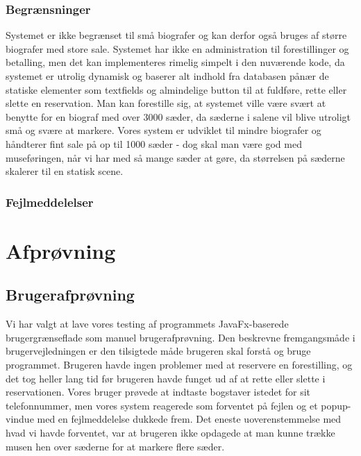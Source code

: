 \documentclass[final]{report}
\begin{document}
\subsection{Begrænsninger}
Systemet er ikke begrænset til små biografer og kan derfor også bruges af større biografer med store sale. Systemet har ikke en administration til forestillinger og betalling, men det kan implementeres rimelig simpelt i den nuværende kode, da systemet er utrolig dynamisk og baserer alt indhold fra databasen pånær de statiske elementer som textfields og almindelige button til at fuldføre, rette eller slette en reservation. Man kan forestille sig, at systemet ville være svært at benytte for en biograf med over 3000 sæder, da sæderne i salene vil blive utroligt små og svære at markere. Vores system er udviklet til mindre biografer og håndterer fint sale på op til 1000 sæder - dog skal man være god med museføringen, når vi har med så mange sæder at gøre, da størrelsen på sæderne skalerer til en statisk scene.

\subsection{Fejlmeddelelser}

\chapter{Afprøvning}

\section{Brugerafprøvning}
Vi har valgt at lave vores testing af programmets JavaFx-baserede brugergrænseflade som manuel brugerafprøvning. Den beskrevne fremgangsmåde i brugervejledningen er den tilsigtede måde brugeren skal forstå og bruge programmet.
Brugeren havde ingen problemer med at reservere en forestilling, og det tog heller lang tid før brugeren havde funget ud af at rette eller slette i reservationen. Vores bruger prøvede at indtaste bogstaver istedet for sit telefonnummer, men vores system reagerede som forventet på fejlen og et popup-vindue med en fejlmeddelelse dukkede frem. Det eneste uoverenstemmelse med hvad vi havde forventet, var at brugeren ikke opdagede at man kunne trække musen hen over sæderne for at markere flere sæder.  
\end{document}

